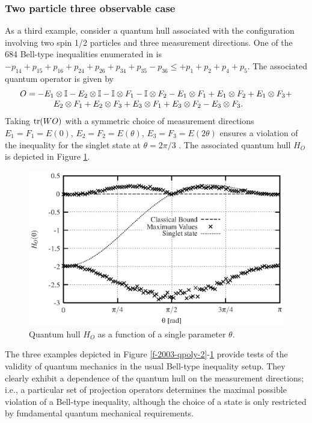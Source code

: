 \subsubsection{Two particle three observable case}
As a third example, consider a quantum hull associated with the
configuration involving two spin 1/2 particles and
three measurement directions. One of the 684 Bell-type inequalities enumerated in
\cite{2000-poly} is
$  - p_{14} + p_{15} + p_{16} +
  p_{24} + p_{26} + p_{34} + p_{35} - p_{36} \leq +p_{1}+ p_{2} + p_{4} + p_{5}$.
The associated quantum operator is given by
\begin{equation}
\begin{array}{l}
  O=- {E}_1 \otimes {\Bbb I} - {E}_2 \otimes {\Bbb I} - {\Bbb I} \otimes {F}_1 - {\Bbb I} \otimes
  {F}_2 -
  {E}_1 \otimes {F}_1 + {E}_1 \otimes {F}_2 + {E}_1 \otimes {F}_3 +\\
\qquad \qquad {E}_2
  \otimes {F}_1 + {E}_2 \otimes {F}_3 +
  {E}_3 \otimes {F}_1 + {E}_3 \otimes {F}_2 - {E}_3 \otimes {F}_3.
\end{array}
  \label{e-2003-poly-xyz}
\end{equation}
Taking ${\rm tr}(WO)$ with a symmetric choice of measurement
directions
${E}_1={F}_1=E(0)$,
${E}_2={F}_2=E(\theta)$,
${E}_3={F}_3=E(2\theta)$ ensures a violation of the inequality for the
singlet state at $\theta=2\pi/3$ \cite{2000-poly}.
The associated
quantum hull  $H_{O}$ is depicted in Figure  \ref{f-2003-plotpit}.
\begin{figure}
  \centering
  \includegraphics{2003-qpoly-plotpit}
  \caption{Quantum hull $H_{O}$  as a function of a single parameter $\theta$.}
  \label{f-2003-plotpit}
\end{figure}

The three examples depicted in Figure
\ref{f-2003-qpoly-2}-\ref{f-2003-plotpit} provide tests of the
validity of quantum mechanics in the usual Bell-type inequality setup.
They clearly exhibit a dependence of
the quantum hull on
the measurement directions; i.e.,
 a particular set of
projection operators determines the maximal possible violation of a
Bell-type inequality, although the choice of a state is only
restricted by fundamental quantum mechanical requirements.


